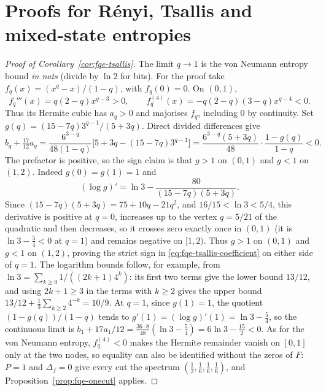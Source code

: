 \section{Proofs for R\'enyi, Tsallis and mixed-state entropies}\label{sec:fqe-spectral-proofs}

\begin{proof}[Proof of Corollary~\ref{cor:fqe-tsallis}]The limit \(q\to1\) is the von Neumann entropy bound \emph{in nats} (divide by
\(\ln2\) for bits). For the proof take \(f_q(x)=(x^q-x)/(1-q)\), with \(f_q(0)=0\). On \((0,1)\), \[
f_q'''(x)=q(2-q)x^{q-3}>0,\qquad
f_q^{(4)}(x)=-q(2-q)(3-q)x^{q-4}<0.
\] Thus its Hermite cubic has \(a_q>0\) and majorises \(f_q\), including \(0\) by continuity. Set
\(g(q)=(15-7q)3^{q-1}/(5+3q)\). Direct divided differences give \[
b_q+\tfrac{17}{12}a_q
=\frac{6^{3-q}}{48(1-q)}
\bigl[5+3q-(15-7q)3^{q-1}\bigr]
=\frac{6^{3-q}(5+3q)}{48}\cdot\frac{1-g(q)}{1-q}<0. \tag{T}\label{eq:fqe-tsallis-coefficient}
\] The prefactor is positive, so the sign claim is that \(g>1\) on \((0,1)\) and \(g<1\) on \((1,2)\).
Indeed \(g(0)=g(1)=1\) and \[
(\log g)'=\ln3-\frac{80}{(15-7q)(5+3q)}.
\] Since \((15-7q)(5+3q)=75+10q-21q^2\), and \(16/15<\ln3<5/4\), this derivative is positive at \(q=0\),
increases up to the vertex \(q=5/21\) of the quadratic and then decreases, so it crosses zero exactly once in
\((0,1)\) (it is \(\ln3-\tfrac54<0\) at \(q=1\)) and remains negative on \([1,2)\). Thus \(g>1\) on \((0,1)\)
and \(g<1\) on \((1,2)\), proving the strict sign in \eqref{eq:fqe-tsallis-coefficient} on either
side of \(q=1\). The logarithm bounds follow, for example, from \(\ln3=\sum_{k\ge0}1/((2k+1)4^k)\):
its first two terms give the lower bound \(13/12\), and using \(2k+1\ge3\) in the terms with \(k\ge2\) gives the upper
bound \(13/12+\tfrac13\sum_{k\ge2}4^{-k}=10/9\). At \(q=1\), since \(g(1)=1\), the quotient \((1-g(q))/(1-q)\) tends to \(g'(1)=(\log g)'(1)=\ln3-\tfrac54\),
so the continuous limit is \(b_1+17a_1/12=\tfrac{36\cdot8}{48}(\ln3-\tfrac54)=6\ln3-\tfrac{15}2<0\).
As for the von Neumann entropy, \(f_q^{(4)}<0\) makes the Hermite remainder vanish on \([0,1]\) only at the two nodes, so
equality can also be identified without the zeros of \(F\): \(P=1\) and \(\Delta_f=0\) give every cut the spectrum
\((\tfrac12,\tfrac16,\tfrac16,\tfrac16)\), and Proposition~\ref{prop:fqe-onecut} applies.

\end{proof}

